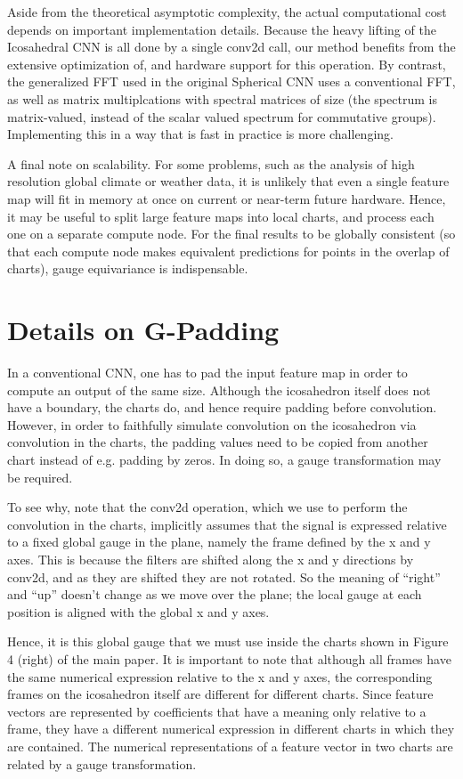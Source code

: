 \documentclass{article}
\begin{document}
Aside from the theoretical asymptotic complexity, the actual computational cost depends on important implementation details.
Because the heavy lifting of the Icosahedral CNN is all done by a single conv2d call, our method benefits from the extensive optimization of, and hardware support for this operation.
By contrast, the generalized FFT used in the original Spherical CNN uses a conventional FFT, as well as matrix multiplcations with spectral matrices of size  (the  spectrum is matrix-valued, instead of the scalar valued spectrum for commutative groups).
Implementing this in a way that is fast in practice is more challenging.

A final note on scalability.
For some problems, such as the analysis of high resolution global climate or weather data, it is unlikely that even a single feature map will fit in memory at once on current or near-term future hardware.
Hence, it may be useful to split large feature maps into local charts, and process each one on a separate compute node.
For the final results to be globally consistent (so that each compute node makes equivalent predictions for points in the overlap of charts), gauge equivariance is indispensable.


\section{Details on G-Padding}

In a conventional CNN, one has to pad the input feature map in order to compute an output of the same size.
Although the icosahedron itself does not have a boundary, the charts do, and hence require padding before convolution.
However, in order to faithfully simulate convolution on the icosahedron via convolution in the charts, the padding values need to be copied from another chart instead of e.g. padding by zeros.
In doing so, a gauge transformation may be required.

To see why, note that the conv2d operation, which we use to perform the convolution in the charts, implicitly assumes that the signal is expressed relative to a fixed global gauge in the plane, namely the frame defined by the x and y axes.
This is because the filters are shifted along the x and y directions by conv2d, and as they are shifted they are not rotated.
So the meaning of ``right'' and ``up'' doesn't change as we move over the plane; the local gauge at each position is aligned with the global x and y axes.

Hence, it is this global gauge that we must use inside the charts shown in Figure 4 (right) of the main paper.
It is important to note that although all frames have the same numerical expression  relative to the x and y axes, the corresponding frames on the icosahedron itself are different for different charts.
Since feature vectors are represented by coefficients that have a meaning only relative to a frame, they have a different numerical expression in different charts in which they are contained.
The numerical representations of a feature vector in two charts are related by a gauge transformation.
\end{document}
